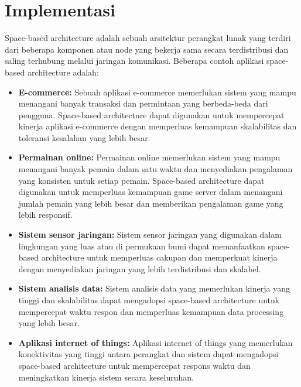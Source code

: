 	\section*{\huge{Implementasi}}
	\large Space-based architecture adalah sebuah arsitektur perangkat lunak yang terdiri dari beberapa komponen atau node yang bekerja sama secara terdistribusi dan saling terhubung melalui jaringan komunikasi. Beberapa contoh aplikasi space-based architecture adalah:
	\begin{itemize}
		\item \large {\textbf{E-commerce:}} Sebuah aplikasi e-commerce memerlukan sistem yang mampu menangani banyak transaksi dan permintaan yang berbeda-beda dari pengguna. Space-based architecture dapat digunakan untuk mempercepat kinerja aplikasi e-commerce dengan memperluas kemampuan skalabilitas dan toleransi kesalahan yang lebih besar.
		\item \large {\textbf{Permainan online:}} Permainan online memerlukan sistem yang mampu menangani banyak pemain dalam satu waktu dan menyediakan pengalaman yang konsisten untuk setiap pemain. Space-based architecture dapat digunakan untuk memperluas kemampuan game server dalam menangani jumlah pemain yang lebih besar dan memberikan pengalaman game yang lebih responsif.
		\item \large {\textbf{Sistem sensor jaringan:}} Sistem sensor jaringan yang digunakan dalam lingkungan yang luas atau di permukaan bumi dapat memanfaatkan space-based architecture untuk memperluas cakupan dan memperkuat kinerja dengan menyediakan jaringan yang lebih terdistribusi dan skalabel.
		\item \large {\textbf{Sistem analisis data:}} Sistem analisis data yang memerlukan kinerja yang tinggi dan skalabilitas dapat mengadopsi space-based architecture untuk mempercepat waktu respon dan memperluas kemampuan data processing yang lebih besar.
		\item \large {\textbf{Aplikasi internet of things:}} Aplikasi internet of things yang memerlukan konektivitas yang tinggi antara perangkat dan sistem dapat mengadopsi space-based architecture untuk mempercepat respons waktu dan meningkatkan kinerja sistem secara keseluruhan.
	\end{itemize}
%